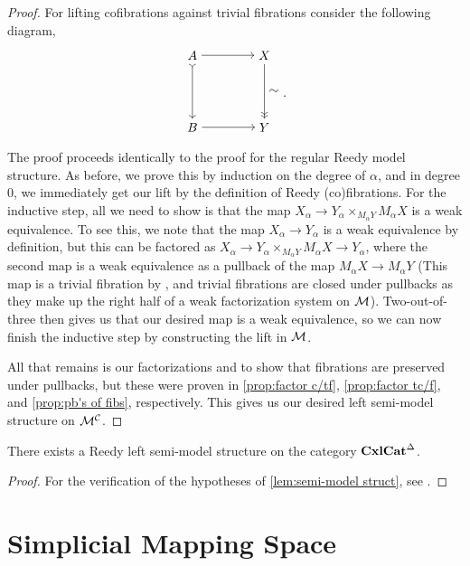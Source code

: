 \documentclass{amsart}
\begin{document}
\begin{proof}
    For lifting cofibrations against trivial fibrations consider the following diagram,
    \[\begin{matrix}\begin{tikzpicture}
        \node (A) at (0,0) {$A$};
        \node (X) at (2,0) {$X$};
        \node (B) at (0,-2) {$B$};
        \node (Y) at (2,-2) {$Y$};
        \draw[>->] (A) to (B);
        \draw[->] (A) to (X);
        \draw[->>] (X) to node[right]{$\sim$} (Y);
        \draw[->] (B) to (Y);
    \end{tikzpicture}\end{matrix}.\]
    The proof proceeds identically to the proof for the regular Reedy model structure. As before, we prove this by induction on the degree of $\alpha$, and in degree 0, we immediately get our lift by the definition of Reedy (co)fibrations. For the inductive step, all we need to show is that the map $X_\alpha\to Y_\alpha\times_{M_\alpha Y}M_\alpha X$ is a weak equivalence. To see this, we note that the map $X_\alpha\to Y_\alpha$ is a weak equivalence by definition, but this can be factored as $X_\alpha\to Y_\alpha\times_{M_\alpha Y}M_\alpha X\to Y_\alpha$, where the second map is a weak equivalence as a pullback of the map $M_\alpha X\to M_\alpha Y$ (This map is a trivial fibration by \cite[15.3.9]{Hirshhorn}, and trivial fibrations are closed under pullbacks as they make up the right half of a weak factorization system on $\mathcal{M}$). Two-out-of-three then gives us that our desired map is a weak equivalence, so we can now finish the inductive step by constructing the lift in $\mathcal{M}$.

    All that remains is our factorizations and to show that fibrations are preserved under pullbacks, but these were proven in \ref{prop:factor c/tf}, \ref{prop:factor tc/f}, and \ref{prop:pb's of fibs}, respectively. This gives us our desired left semi-model structure on $\mathcal{M}^{\mathcal{C}}$.
\end{proof}

\begin{cor}
    There exists a Reedy left semi-model structure on the category $\operatorname{\mathbf{CxlCat}}^\Delta$.
\end{cor}
\begin{proof}
    For the verification of the hypotheses of \ref{lem:semi-model struct}, see \cite[\S 6]{KL}.
\end{proof}

\section{Simplicial Mapping Space}
\end{document}
